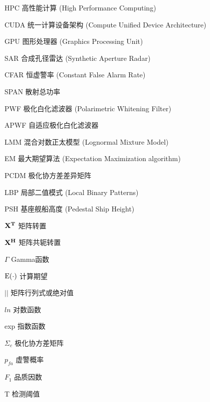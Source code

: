 \begin{denotation}[3cm]
\item[HPC] 高性能计算 (High Performance Computing)
\item[CUDA] 统一计算设备架构 (Compute Unified Device Architecture)
\item[GPU] 图形处理器 (Graphics Processing Unit)
\item[SAR] 合成孔径雷达 (Synthetic Aperture Radar)
\item[CFAR] 恒虚警率 (Constant False Alarm Rate)
\item[SPAN] 散射总功率
\item[PWF] 极化白化滤波器 (Polarimetric Whitening Filter)
\item[APWF] 自适应极化白化滤波器
\item[LMM] 混合对数正太模型 (Lognormal Mixture Model)
\item[EM] 最大期望算法 (Expectation Maximization algorithm)
\item[PCDM] 极化协方差差异矩阵
\item[LBP] 局部二值模式 (Local Binary Patterns)
\item[PSH] 基座舰船高度 (Pedestal Ship Height)
\item[$\bf{X}^T$] 矩阵转置
\item[$\bf{X}^H$] 矩阵共轭转置
\item[$\Gamma$] Gamma函数 
\item[${\rm{E}}( \cdot )$] 计算期望
\item[$\left| {} \right|$] 矩阵行列式或绝对值
\item[$ln$] 对数函数
\item[exp] 指数函数  
\item[$\Sigma_c$]	极化协方差矩阵
\item[$p_{fa}$] 虚警概率
\item[$F_1$] 品质因数
\item[T] 检测阈值
\end{denotation}
